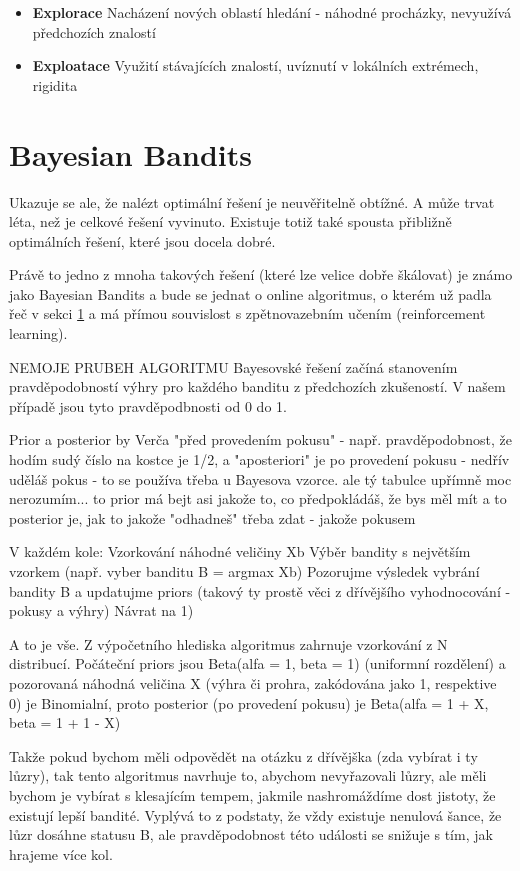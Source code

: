 \documentclass[thesis=M,czech]{FITthesis}[2014/05/07]
\begin{document}
\begin{itemize}
  \item \textbf{Explorace} Nacházení nových oblastí hledání - náhodné procházky, nevyužívá předchozích znalostí
  \item \textbf{Exploatace} Využití stávajících znalostí, uvíznutí v lokálních extrémech, rigidita
\end{itemize}	

\section{Bayesian Bandits}

Ukazuje se ale, že nalézt optimální řešení je neuvěřitelně obtížné. A může trvat léta, než je celkové řešení vyvinuto. Existuje totiž také spousta přibližně optimálních řešení, které jsou docela dobré. 

Právě to jedno z mnoha takových řešení (které lze velice dobře škálovat) je známo jako Bayesian Bandits a bude se jednat o online algoritmus, o kterém už padla řeč v sekci \ref{} a má přímou souvislost s zpětnovazebním učením (reinforcement learning).

NEMOJE PRUBEH ALGORITMU
Bayesovské řešení začíná stanovením pravděpodobností výhry pro každého banditu z předchozích zkušeností. V našem případě jsou tyto pravděpodbnosti od 0 do 1. 

Prior a posterior by Verča
"před provedením pokusu" - např. pravděpodobnost, že hodím sudý číslo na kostce je 1/2, a "aposteriori" je po provedení pokusu - nedřív uděláš pokus - to se používa třeba u Bayesova vzorce. ale tý tabulce upřímně moc nerozumím... to prior má bejt asi jakože to, co předpokládáš, že bys měl mít a to posterior je, jak to jakože "odhadneš" třeba  zdat - jakože pokusem

V každém kole:
Vzorkování náhodné veličiny Xb 
Výběr bandity s největším vzorkem (např. vyber banditu B = argmax Xb)
Pozorujme výsledek vybrání bandity B a updatujme priors (takový ty prostě věci z dřívějšího vyhodnocování - pokusy a výhry)
Návrat na 1)

A to je vše. Z výpočetního hlediska algoritmus zahrnuje vzorkování z N distribucí. Počáteční priors jsou Beta(alfa = 1, beta = 1) (uniformní rozdělení) a pozorovaná náhodná veličina X (výhra či prohra, zakódována jako 1, respektive 0) je Binomialní, proto posterior (po provedení pokusu) je Beta(alfa = 1 + X, beta = 1 + 1 - X)

Takže pokud bychom měli odpovědět na otázku z dřívějška (zda vybírat i ty lůzry), tak tento algoritmus navrhuje to, abychom nevyřazovali lůzry, ale měli bychom je vybírat s klesajícím tempem, jakmile nashromáždíme dost jistoty, že existují lepší bandité. Vyplývá to z podstaty, že vždy existuje nenulová šance, že lůzr dosáhne statusu B, ale pravděpodobnost této události se snižuje s tím, jak hrajeme více kol. 
\end{document}
